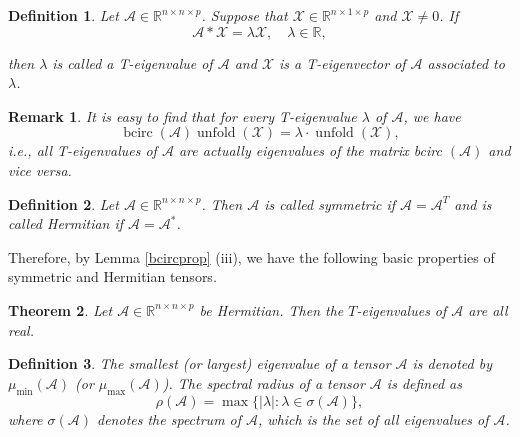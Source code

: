 \documentclass[oupthm]{CUP-JNL-BCM}%
\theoremstyle{oupplain}
\newtheorem{theorem}{Theorem}[section]
\theoremstyle{oupdefinition}
\newtheorem{definition}{Definition}[section]
\theoremstyle{oupremark}
\newtheorem{remark}[theorem]{Remark}
\theoremstyle{oupproof}
\numberwithin{equation}{section}
\begin{document}
\begin{definition}\label{eignvalue}\cite{kathrinLund}
    Let $\mathcal{A} \in \mathbb{R}^{n \times n \times p}$. Suppose that $\mathcal{X} \in \mathbb{R}^{n \times 1 \times p}$ and $\mathcal{X} \neq 0$. If
$$
\mathcal{A} * \mathcal{X}=\lambda \mathcal{X}, \quad \lambda \in \mathbb{R},
$$

\noindent then $\lambda$ is called a T-eigenvalue of $\mathcal{A}$ and $\mathcal{X}$ is a T-eigenvector of $\mathcal{A}$ associated to $\lambda$.
\end{definition} 
\begin{remark}\label{rmrk1}
    It is easy to find that for every T-eigenvalue $\lambda$ of $\mathcal{A}$, we have
$$
\operatorname{bcirc}(\mathcal{A}) \operatorname{unfold}(\mathcal{X})=\lambda \cdot \operatorname{unfold}(\mathcal{X}),
$$
i.e., all T-eigenvalues of $\mathcal{A}$ are actually eigenvalues of the matrix bcirc $(\mathcal{A})$ and vice versa. 
\end{remark} 

\begin{definition}\cite{kathrinLund}
    Let $\mathcal{A} \in \mathbb{R}^{n \times n \times p}$. Then $\mathcal{A}$ is called symmetric if $\mathcal{A}=\mathcal{A}^T$ and is called Hermitian if $\mathcal{A}=\mathcal{A}^*$.
\end{definition}
 \noindent Therefore, by Lemma \ref{bcircprop} (iii), we have the following basic properties of symmetric and Hermitian tensors.

\begin{theorem}\cite{kathrinLund}
    Let $\mathcal{A} \in \mathbb{R}^{n \times n \times p}$ be Hermitian. Then the $T$-eigenvalues of $\mathcal{A}$ are all real.
\end{theorem} 


\begin{definition} \cite{minmax}
  The smallest (or largest) eigenvalue of a tensor \( \mathcal{A} \) is denoted by \( \mu_{\min}(\mathcal{A}) \) (or \( \mu_{\max}(\mathcal{A}) \)). The spectral radius of a tensor \( \mathcal{A} \) is defined as  
\[
\rho(\mathcal{A}) = \max \{ |\lambda| : \lambda \in \sigma(\mathcal{A}) \},
\]  
where \( \sigma(\mathcal{A}) \) denotes the spectrum of \( \mathcal{A} \), which is the set of all eigenvalues of \( \mathcal{A} \).  


\end{definition}


\end{document}
